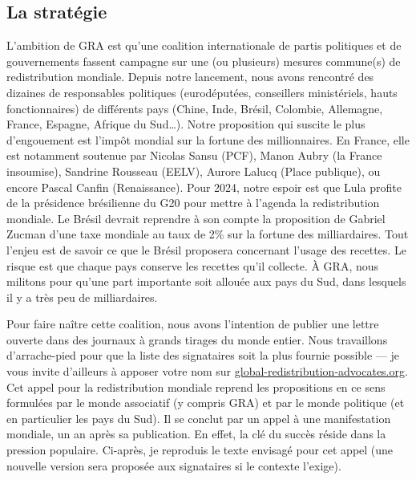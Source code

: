 \documentclass[a5paper,french,openany]{memoir}
\begin{document}
\subsection{La stratégie}

L'ambition de GRA est qu'une coalition internationale de partis politiques et de gouvernements fassent campagne sur une (ou plusieurs) mesures commune(s) de redistribution mondiale. Depuis notre lancement, nous avons rencontré des dizaines de responsables politiques (eurodéputé\textperiodcentered{}e\textperiodcentered{}s, conseillers ministériels, hauts fonctionnaires) de différents pays (Chine, Inde, Brésil, Colombie, Allemagne, France, Espagne, Afrique du Sud\dots). Notre proposition qui suscite le plus d'engouement est l'impôt mondial sur la fortune des millionnaires. En France, elle est notamment soutenue par Nicolas Sansu (PCF), Manon Aubry (la France insoumise), Sandrine Rousseau (EELV), Aurore Lalucq (Place publique), ou encore Pascal Canfin (Renaissance). %
Pour 2024, notre espoir est que Lula profite de la présidence brésilienne du G20 pour mettre à l'agenda la redistribution mondiale. Le Brésil devrait reprendre à son compte la proposition de Gabriel Zucman d'une taxe mondiale au taux de 2\% sur la fortune des milliardaires. Tout l'enjeu est de savoir ce que le Brésil proposera concernant l'usage des recettes. Le risque est que chaque pays conserve les recettes qu'il collecte. À GRA, nous militons pour qu'une part importante soit allouée aux pays du Sud, dans lesquels il y a très peu de milliardaires.

Pour faire naître cette coalition, nous avons l'intention de publier une lettre ouverte dans des journaux à grands tirages du monde entier. Nous travaillons d'arrache-pied pour que la liste des signataires soit la plus fournie possible --- je vous invite d'ailleurs à apposer votre nom sur \href{https://global-redistribution-advocates.org/fr/signer-les-petitions}{global-redistribution-advocates.org}. Cet appel pour la redistribution mondiale reprend les propositions en ce sens formulées par le monde  associatif (y compris GRA) et par le monde politique (et en particulier les pays du Sud). Il se conclut par un appel à une manifestation mondiale, un an après sa publication. En effet, la clé du succès réside dans la pression populaire. Ci-après, je reproduis le texte envisagé pour cet appel (une nouvelle version sera proposée aux signataires si le contexte l'exige).%
\end{document}
